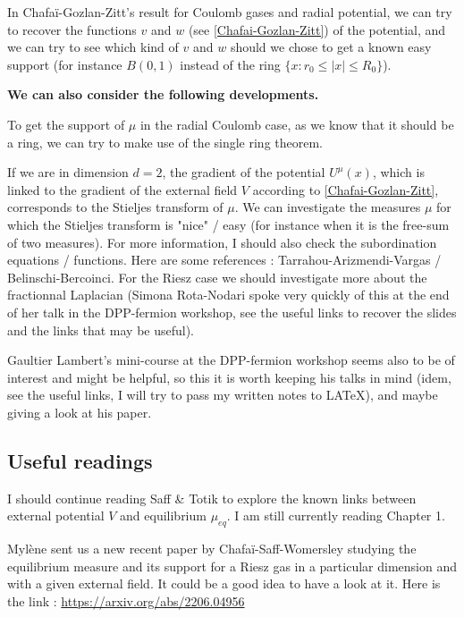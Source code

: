 \documentclass[a4paper,12pt]{report}
\begin{document}
In Chafaï-Gozlan-Zitt's result for Coulomb gases and radial potential, we can try to recover the functions $v$ and $w$ (see \ref{Chafai-Gozlan-Zitt}) of the potential, and we can try to see which kind of $v$ and $w$ should we chose to get a known easy support (for instance $B(0, 1)$ instead of the ring $\{x : r_0 \leq |x| \leq R_0\}$).
\vspace{0.5cm}

\textbf{We can also consider the following developments.}
\vspace{0.5cm}

To get the support of $\mu$ in the radial Coulomb case, as we know that it should be a ring, we can try to make use of the single ring theorem.
\vspace{0.5cm}

If we are in dimension $d = 2$, the gradient of the potential $U^{\mu}(x)$, which is linked to the gradient of the external field $V$ according to \ref{Chafai-Gozlan-Zitt},  corresponds to the Stieljes transform of $\mu$. We can investigate the measures $\mu$ for which the Stieljes transform is "nice" / easy (for instance when it is the free-sum of two measures). For more information, I should also check the subordination equations / functions. Here are some references : Tarrahou-Arizmendi-Vargas / Belinschi-Bercoinci. For the Riesz case we should investigate more about the fractionnal Laplacian (Simona Rota-Nodari spoke very quickly of this at the end of her talk in the DPP-fermion workshop, see the useful links to recover the slides and the links that may be useful).
\vspace{0.5cm}

Gaultier Lambert's mini-course at the DPP-fermion workshop seems also to be of interest and might be helpful, so this it is worth keeping his talks in mind (idem, see the useful links, I will try to pass my written notes to LATeX), and maybe giving a look at his paper.



\subsection*{Useful readings}

I should continue reading Saff \& Totik \cite{saff-totik} to explore the known links between external potential $V$ and equilibrium $\mu_{eq}$. I am still currently reading Chapter 1.
\vspace{0.5cm}

Mylène sent us a new recent paper by Chafaï-Saff-Womersley \cite{chafai-saff-womersley} studying the equilibrium measure and its support for a Riesz gas in a particular dimension and with a given external field. It could be a good idea to have a look at it. Here is the link : \href{https://arxiv.org/abs/2206.04956}{https://arxiv.org/abs/2206.04956}
\end{document}
